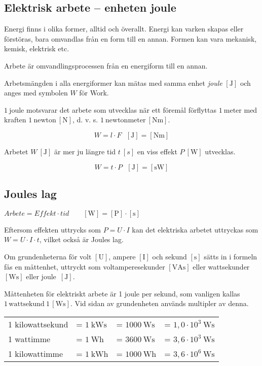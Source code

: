 \subsection{Elektrisk arbete -- enheten joule}
\frdjp
{}

Energi finns i olika former, alltid och överallt.
Energi kan varken skapas eller förstöras, bara omvandlas från en form till en
annan.
Formen kan vara mekanisk, kemisk, elektrisk etc.

Arbete är omvandlingsprocessen från en energiform till en annan.

Arbetsmängden i alla energiformer kan mätas med samma enhet \emph{joule}
\(\mathrm{[J]}\) \cite{SIbrochure8} och anges med symbolen \(W\) för Work.

\(1\ \mathrm{joule}\) motsvarar det arbete som utvecklas när ett föremål
förflyttas \(1\ \mathrm{meter}\) med kraften \(1\ \mathrm{newton\ [N]}\),
d. v. s. \(1\ \mathrm{newtonmeter\ [Nm]}\).

\[W = l \cdot F \ \ \ \mathrm{[J] = [Nm]}\]

Arbetet \(W\ \mathrm{[J]}\) är mer ju längre tid \(t\ [s]\) en viss effekt
\(P\ \mathrm{[W]}\) utvecklas.

\[W = t \cdot P \ \ \ \mathrm{[J] = [sW]}\]

\subsection{Joules lag}
\label{joules_lag}

\(\textit{Arbete} = \textit{Effekt} \cdot \textit{tid}\qquad \mathrm{[W]} = \mathrm{[P]} \cdot \mathrm{[s]}\)

Eftersom effekten uttrycks som \(P = U \cdot I\) kan det elektriska arbetet
uttryckas som \(W = U \cdot I \cdot t\), vilket också är Joules lag.

Om grundenheterna för volt \(\mathrm{[U]}\), ampere \(\mathrm{[I]}\) och
sekund \(\mathrm{[s]}\) sätts in i formeln fås en måttenhet, uttryckt som
voltamperesekunder \(\mathrm{[VAs]}\) eller wattsekunder \(\mathrm{[Ws]}\)
eller joule\ \(\mathrm{[J]}\).

Måttenheten för elektriskt arbete är 1 joule per sekund, som vanligen
kallas \(1\,\mathrm{wattsekund}\ 1\,\mathrm{[Ws]}\).
Vid sidan av grundenheten används multipler av denna.

\begin{center}
\small
\noindent
\begin{tabular}{@{}l@{\,}l@{}l@{}l@{}}
   1 kilowattsekund & = $1\ \text{kWs}$ & = $1000\ \text{Ws}$ & = $1,0\cdot 10^3\ \text{Ws}$ \\
   1 wattimme       & = $1\ \text{Wh}$  & = $3600\ \text{Ws}$ & = $3,6\cdot 10^3\ \text{Ws}$ \\
   1 kilowattimme   & = $1\ \text{kWh}$ & = $1000\ \text{Wh}$ & = $3,6\cdot 10^6\ \text{Ws}$
\end{tabular}
\end{center}

